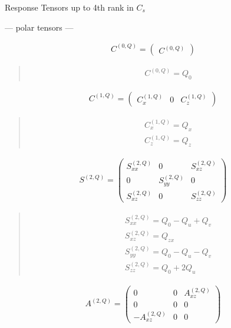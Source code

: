 \documentclass[fleqn,10pt]{jsarticle}
\begin{document}
\setcounter{MaxMatrixCols}{16}

\begin{center}
\LARGE
Response Tensors up to 4th rank in $C_{s}$
\end{center}
\begin{center}\LARGE --- polar tensors ---\end{center}
\begin{align*}
C^{(0,Q)} = \begin{pmatrix} C^{(0,Q)} \end{pmatrix}
\end{align*}
\begin{quote}
\begin{align*}
& C^{(0,Q)} = Q_{0}
\end{align*}
\end{quote}
\begin{align*}
C^{(1,Q)} = \begin{pmatrix} C^{(1,Q)}_{x} & 0 & C^{(1,Q)}_{z} \end{pmatrix}
\end{align*}
\begin{quote}
\begin{align*}
& C^{(1,Q)}_{x} = Q_{x} \\
& C^{(1,Q)}_{z} = Q_{z}
\end{align*}
\end{quote}
\begin{align*}
S^{(2,Q)} = \begin{pmatrix} S^{(2,Q)}_{xx} & 0 & S^{(2,Q)}_{xz} \\ 0 & S^{(2,Q)}_{yy} & 0 \\ S^{(2,Q)}_{xz} & 0 & S^{(2,Q)}_{zz} \end{pmatrix}
\end{align*}
\begin{quote}
\begin{align*}
& S^{(2,Q)}_{xx} = Q_{0} - Q_{u} + Q_{v} \\
& S^{(2,Q)}_{xz} = Q_{zx} \\
& S^{(2,Q)}_{yy} = Q_{0} - Q_{u} - Q_{v} \\
& S^{(2,Q)}_{zz} = Q_{0} + 2 Q_{u}
\end{align*}
\end{quote}
\begin{align*}
A^{(2,Q)} = \begin{pmatrix} 0 & 0 & A^{(2,Q)}_{xz} \\ 0 & 0 & 0 \\ - A^{(2,Q)}_{xz} & 0 & 0 \end{pmatrix}
\end{align*}
\end{document}
